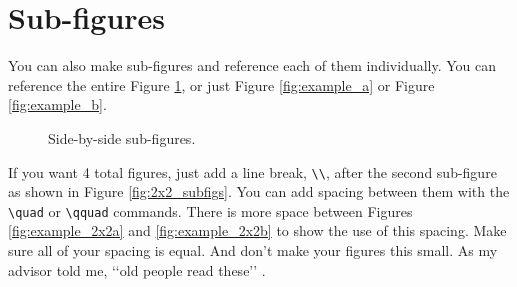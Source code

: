 \documentclass[12pt]{report}
\begin{document}
\section{Sub-figures}
You can also make sub-figures and reference each of them individually.  You can reference the entire Figure \ref{fig:1x2_subfigs}, or just Figure \ref{fig:example_a} or Figure \ref{fig:example_b}.
\begin{figure}[!ht]
   \centering
   \caption{Side-by-side sub-figures.}
   \label{fig:1x2_subfigs}
\end{figure}


If you want 4 total figures, just add a line break, \verb'\\', after the second sub-figure as shown in Figure \ref{fig:2x2_subfigs}.  You can add spacing between them with the \verb'\quad' or \verb'\qquad' commands.  There is more space between Figures \ref{fig:example_2x2a} and \ref{fig:example_2x2b} to show the use of this spacing.  Make sure all of your spacing is equal.  And don\rq{}t make your figures this small.  As my advisor told me, \lq\lq{}old people read these\rq\rq{} \cite{Mark}.
\end{document}
